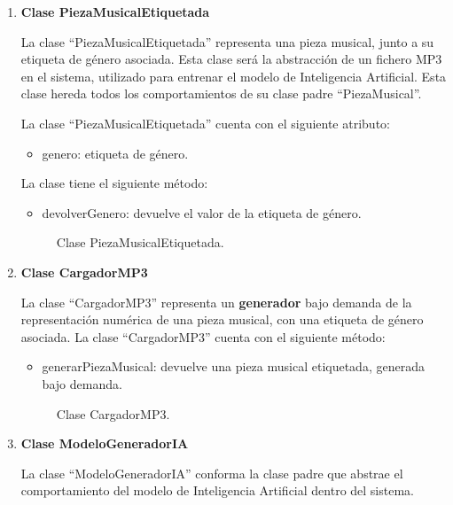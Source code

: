 \begin{enumerate}
  \item \textbf{Clase PiezaMusicalEtiquetada}

  La clase ``PiezaMusicalEtiquetada'' representa una pieza musical, junto a su etiqueta de género asociada. Esta clase será la abstracción de un fichero MP3 en el sistema, utilizado para entrenar el modelo de Inteligencia Artificial. Esta clase hereda todos los comportamientos de su clase padre ``PiezaMusical''.

  La clase ``PiezaMusicalEtiquetada'' cuenta con el siguiente atributo:

  \begin{itemize}
      \item genero: etiqueta de género.
  \end{itemize}

  La clase tiene el siguiente método:

  \begin{itemize}
      \item devolverGenero: devuelve el valor de la etiqueta de género.
  \end{itemize}

  \begin{figure}[H]
    \centering
    
    \caption{Clase PiezaMusicalEtiquetada.}
  \end{figure}

  \item \textbf{Clase CargadorMP3}

  La clase ``CargadorMP3'' representa un \textbf{generador} bajo demanda de la representación numérica de una pieza musical, con una etiqueta de género asociada.
  La clase ``CargadorMP3'' cuenta con el siguiente método:

  \begin{itemize}
      \item generarPiezaMusical: devuelve una pieza musical etiquetada, generada bajo demanda.
  \end{itemize}

  \begin{figure}[H]
    \centering
    
    \caption{Clase CargadorMP3.}
  \end{figure}

  \item \textbf{Clase ModeloGeneradorIA}

  La clase ``ModeloGeneradorIA'' conforma la clase padre que abstrae el comportamiento del modelo de Inteligencia Artificial dentro del sistema.


\end{enumerate}
